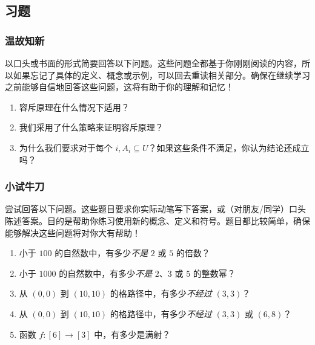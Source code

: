 
\subsection{习题}

\subsubsection*{温故知新}

以口头或书面的形式简要回答以下问题。这些问题全都基于你刚刚阅读的内容，所以如果忘记了具体的定义、概念或示例，可以回去重读相关部分。确保在继续学习之前能够自信地回答这些问题，这将有助于你的理解和记忆！

\begin{enumerate}[label=(\arabic*)]
    \item 容斥原理在什么情况下适用？
    \item 我们采用了什么策略来证明容斥原理？
    \item 为什么我们要求对于每个 $i, A_i \subseteq U$？如果这些条件不满足，你认为结论还成立吗？
\end{enumerate}

\subsubsection*{小试牛刀}

尝试回答以下问题。这些题目要求你实际动笔写下答案，或（对朋友/同学）口头陈述答案。目的是帮助你练习使用新的概念、定义和符号。题目都比较简单，确保能够解决这些问题将对你大有帮助！

\begin{enumerate}[label=(\arabic*)]
    \item 小于 $100$ 的自然数中，有多少\emph{不是} $2$ 或 $5$ 的倍数？
    \item 小于 $1000$ 的自然数中，有多少\emph{不是} $2$、$3$ 或 $5$ 的整数幂？
    \item 从 $(0, 0)$ 到 $(10, 10)$ 的格路径中，有多少\emph{不经过} $(3, 3)$？
    \item 从 $(0, 0)$ 到 $(10, 10)$ 的格路径中，有多少\emph{不经过} $(3, 3)$ 或 $(6, 8)$？
    \item 函数 $ f : [6] \to [3]$ 中，有多少是满射？
\end{enumerate}